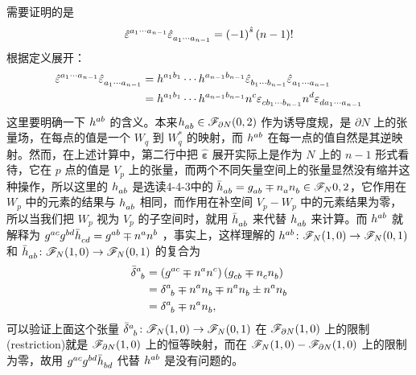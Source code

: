 \begin{xiti}
	\begin{zm}
		需要证明的是
		\begin{displaymath}
		\tensor{\hat{\varepsilon}}{^{a_1 \cdots a_{n-1} }} \tensor{\hat{\varepsilon}}{_{ a_1 \cdots a_{n-1} }} = \left(-1\right)^{\hat{s}} \left(n-1\right)!
		\end{displaymath}
		根据定义展开：
		\begin{align*}
		\tensor{\hat{\varepsilon}}{^{a_1 \cdots a_{n-1} }} \tensor{\hat{\varepsilon}}{_{ a_1 \cdots a_{n-1} }} &= \tensor{h}{^{a_1 b_1}} \cdots \tensor{h}{^{a_{n-1} b_{n-1} }} \tensor{\hat{\varepsilon}}{_{b_1 \cdots b_{n-1} }} \tensor{\hat{\varepsilon}}{_{ a_1 \cdots a_{n-1} }}\\
		&= \tensor{h}{^{a_1 b_1}} \cdots \tensor{h}{^{a_{n-1} b_{n-1} }} \tensor{n}{^c} \tensor{\varepsilon}{_{c b_1 \cdots b_{n-1} }} \tensor{n}{^d} \tensor{\varepsilon}{_{ d a_1 \cdots a_{n-1} }}
		\end{align*}
		这里要明确一下 $\tensor{h}{^a^b}$ 的含义。本来$\tensor{h}{_a_b} \in \F_{\partial N}(0,2)$ 作为诱导度规，是 $\partial N$ 上的张量场，在每点的值是一个 $W_q $ 到 $W_q^* $ 的映射，而 $\tensor{h}{^a^b}$ 在每一点的值自然是其逆映射。然而，在上述计算中，第二行中把 $\bm{\hat{\varepsilon}}$ 展开实际上是作为 $N$ 上的 $n-1$ 形式看待，它在 $p$ 点的值是 $V_p$ 上的张量，而两个不同矢量空间上的张量显然没有缩并这种操作，所以这里的 $\tensor{h}{_a_b}$ 是选读4-4-3中的 $\tensor{\bar{h}}{_a_b} = \tensor{g}{_a_b} \mp \tensor{n}{_a} \tensor{n}{_b} \in \F_N{0,2} $，它作用在 $W_p$ 中的元素的结果与 $\tensor{h}{_a_b}$ 相同，而作用在补空间 $V_p-W_p$ 中的元素结果为零，所以当我们把 $W_p$ 视为 $V_p$ 的子空间时，就用 $\tensor{\bar{h}}{_a_b}$ 来代替 $\tensor{h}{_a_b}$ 来计算。而 $\tensor{h}{^a^b}$ 就解释为 $\tensor{g}{^a^c} \tensor{g}{^b^d} \tensor{\bar{h}}{_c_d} = \tensor{g}{^a^b} \mp \tensor{n}{^a} \tensor{n}{^b}$ ，事实上，这样理解的 $\tensor{h}{^a^b} \colon \F_N (1,0) \rightarrow \F_N(0,1) $ 和 $\tensor{\bar{h}}{_a_b} \colon \F_N (1,0) \rightarrow \F_N (0,1) $ 的复合为
		\begin{align*}
		\tensor{\bar{\delta}}{^a_b} &= \left( \tensor{g}{^a^c} \mp \tensor{n}{^a} \tensor{n}{^c} \right) \left( \tensor{g}{_c_b} \mp \tensor{n}{_c} \tensor{n}{_b} \right)\\
		&= \tensor{\delta}{^a_b} \mp \tensor{n}{^a} \tensor{n}{_b} \mp \tensor{n}{^a} \tensor{n}{_b} \pm \tensor{n}{^a} \tensor{n}{_b}\\
		&= \tensor{\delta}{^a_b} \mp \tensor{n}{^a} \tensor{n}{_b},
		\end{align*}
		可以验证上面这个张量 $\tensor{\bar{\delta}}{^a_b} \colon \F_N(1,0) \rightarrow \F_N(0,1) $ 在 $\mathscr{F}_{\partial N}(1,0) $ 上的限制(restriction)就是 $\mathscr{F}_{\partial N}(1,0) $ 上的恒等映射，而在 $\mathscr{F}_N(1,0) - \mathscr{F}_{\partial N}(1,0) $ 上的限制为零，故用 $\tensor{g}{^a^c} \tensor{g}{^b^d} \tensor{\bar{h}}{_b_d}$ 代替 $\tensor{h}{^a^b}$ 是没有问题的。
		

\end{zm}
\end{xiti}
